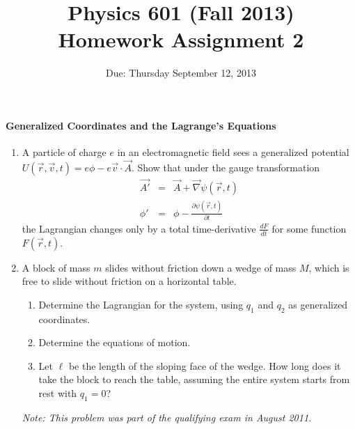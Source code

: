 \documentclass[letterpaper,11pt]{article}
\title{Physics 601 (Fall 2013) \\ Homework Assignment 2}
\date{Due: Thursday September 12, 2013}
\begin{document}
\maketitle

\paragraph*{Generalized Coordinates and the Lagrange's Equations}
\begin{enumerate}
 \item A particle of charge $e$ in an electromagnetic field sees a generalized potential $U(\vec{r},\vec{v},t) = e \phi - e \vec{v} \cdot \vec{A}$.  Show that under the gauge transformation
  \begin{eqnarray*}
   \vec{A'} & = & \vec{A} + \vec{\nabla} \psi(\vec{r},t) \\
   \phi'    & = & \phi - \frac{\partial\psi(\vec{r},t)}{\partial t}
  \end{eqnarray*}
 the Lagrangian changes only by a total time-derivative $\frac{dF}{dt}$ for some function $F(\vec{r},t)$.
 \item A block of mass $m$ slides without friction down a wedge of mass $M$, which is free to slide without friction on a horizontal table.
 \begin{enumerate}
  \item Determine the Lagrangian for the system, using $q_1$ and $q_2$ as generalized coordinates.
  \item Determine the equations of motion.
  \item Let $\ell$ be the length of the sloping face of the wedge.  How long does it take the block to reach the table, assuming the entire system starts from rest with $q_1 = 0$?
 \end{enumerate}
 \textit{Note: This problem was part of the qualifying exam in August 2011.}
 \begin{center}

\end{center}
\end{enumerate}
\end{document}
